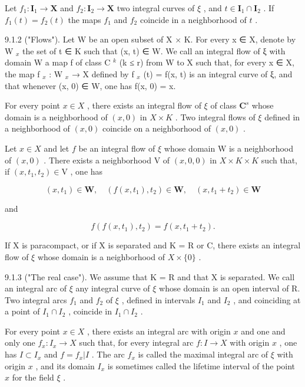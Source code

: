 Let \(f_{1}\colon\mathbf{I}_{1}\to\mathbf{X}\) and \(f_{2}\colon\mathbf{I}_{2}\to\mathbf{X}\) two integral curves of \(\xi\) , and \(t\in\mathbf{I}_{1}\cap\mathbf{I}_{2}\) . If \(f_{1}(t)=f_{2}(t)\) the maps \(f_{1}\) and \(f_{2}\) coincide in a neighborhood of \(t\) .

9.1.2 ("Flows"). Let W be an open subset of X × K. For every x ∈ X, denote by W \(_{x}\) the set of t ∈ K such that (x, t) ∈ W. We call an integral flow of ξ with domain W a map f of class C \(^{k}\) (k ≤ r) from W to X such that, for every x ∈ X, the map f \(_{x}\) : W \(_{x}\) → X defined by f \(_{x}\) (t) = f(x, t) is an integral curve of ξ, and that whenever (x, 0) ∈ W, one has f(x, 0) = x.

For every point \(x \in X\) , there exists an integral flow of \(\xi\) of class \(\mathbf{C}^s\) whose domain is a neighborhood of \((x, 0)\) in \(X \times K\) . Two integral flows of \(\xi\) defined in a neighborhood of \((x, 0)\) coincide on a neighborhood of \((x, 0)\) .

Let \(x\in X\) and let \(f\) be an integral flow of \(\xi\) whose domain W is a neighborhood of \((x,0)\) . There exists a neighborhood V of \((x,0,0)\) in \(X \times K \times K\) such that, if \((x,t_{1},t_{2})\in\mathrm{V}\) , one has

\[
(x, t _ {1}) \in \mathbf {W}, \quad (f (x, t _ {1}), t _ {2}) \in \mathbf {W}, \quad (x, t _ {1} + t _ {2}) \in \mathbf {W}
\]

and

\[
f (f (x, t _ {1}), t _ {2}) = f (x, t _ {1} + t _ {2}).\tag{2}
\]

If X is paracompact, or if X is separated and K = R or C, there exists an integral flow of \(\xi\) whose domain is a neighborhood of \(X \times \{0\}\) .

9.1.3 ("The real case"). We assume that K = R and that X is separated. We call an integral arc of \(\xi\) any integral curve of \(\xi\) whose domain is an open interval of R. Two integral arcs \(f_{1}\) and \(f_{2}\) of \(\xi\) , defined in intervals \(I_{1}\) and \(I_{2}\) , and coinciding at a point of \(I_{1} \cap I_{2}\) , coincide in \(I_{1} \cap I_{2}\) .

For every point \(x \in X\) , there exists an integral arc with origin \(x\) and one and only one \(f_x: I_x \to X\) such that, for every integral arc \(f: I \to X\) with origin \(x\) , one has \(I \subset I_x\) and \(f = f_x|I\) . The arc \(f_x\) is called the maximal integral arc of \(\xi\) with origin \(x\) , and its domain \(I_x\) is sometimes called the lifetime interval of the point \(x\) for the field \(\xi\) .

